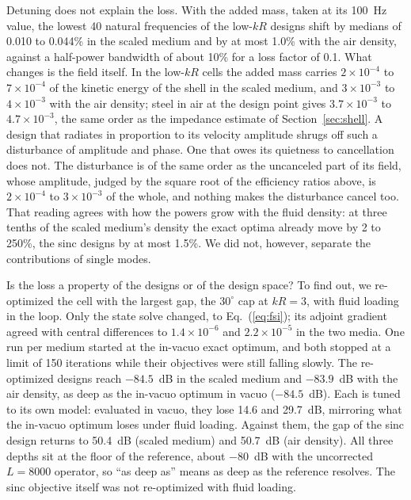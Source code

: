 \documentclass[preprint,12pt]{elsarticle}
\begin{document}
Detuning does not explain the loss. With the added mass, taken at its 100~Hz value, the lowest 40 natural frequencies of the low-$kR$ designs shift by medians of 0.010 to 0.044\% in the scaled medium and by at most 1.0\% with the air density, against a half-power bandwidth of about 10\% for a loss factor of 0.1. %
What changes is the field itself. In the low-$kR$ cells the added mass carries $2\times10^{-4}$ to $7\times10^{-4}$ of the kinetic energy of the shell in the scaled medium, and $3\times10^{-3}$ to $4\times10^{-3}$ with the air density; steel in air at the design point gives $3.7\times10^{-3}$ to $4.7\times10^{-3}$, the same order as the impedance estimate of Section~\ref{sec:shell}. %
A design that radiates in proportion to its velocity amplitude shrugs off such a disturbance of amplitude and phase. One that owes its quietness to cancellation does not. The disturbance is of the same order as the uncanceled part of its field, whose amplitude, judged by the square root of the efficiency ratios above, is $2\times10^{-4}$ to $3\times10^{-3}$ of the whole, and nothing makes the disturbance cancel too. That reading agrees with how the powers grow with the fluid density: at three tenths of the scaled medium's density the exact optima already move by 2 to 250\%, the sinc designs by at most 1.5\%. We did not, however, separate the contributions of single modes. %

Is the loss a property of the designs or of the design space? To find out, we re-optimized the cell with the largest gap, the $30^\circ$ cap at $kR=3$, with fluid loading in the loop. Only the state solve changed, to Eq.~(\ref{eq:fsi}); its adjoint gradient agreed with central differences to $1.4\times10^{-6}$ and $2.2\times10^{-5}$ in the two media. One run per medium started at the in-vacuo exact optimum, and both stopped at a limit of 150 iterations while their objectives were still falling slowly. %
The re-optimized designs reach $-84.5$~dB in the scaled medium and $-83.9$~dB with the air density, as deep as the in-vacuo optimum in vacuo ($-84.5$~dB). Each is tuned to its own model: evaluated in vacuo, they lose 14.6 and 29.7~dB, mirroring what the in-vacuo optimum loses under fluid loading. Against them, the gap of the sinc design returns to 50.4~dB (scaled medium) and 50.7~dB (air density). All three depths sit at the floor of the reference, about $-80$~dB with the uncorrected $L=8000$ operator, so ``as deep as'' means as deep as the reference resolves. The sinc objective itself was not re-optimized with fluid loading. %
\end{document}
